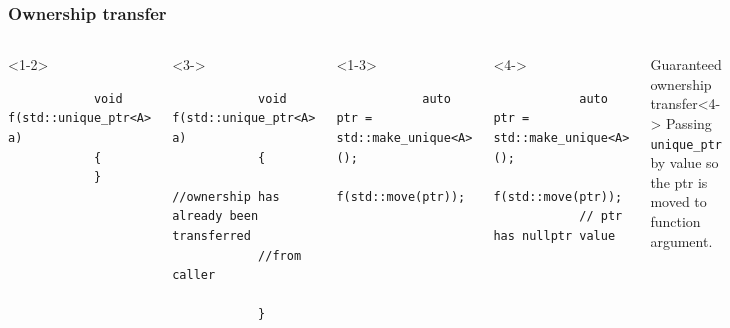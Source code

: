 \documentclass{beamer}
\begin{document}
\begin{frame}[fragile,t]
\frametitle{Ownership transfer}
	\begin{columns}[T]
        \begin{onlyenv}<1-2>
        \begin{lstlisting}
			void f(std::unique_ptr<A> a)
			{
			}	
		\end{lstlisting}
        \end{onlyenv}
        \begin{onlyenv}<3->
        \begin{lstlisting}
			void f(std::unique_ptr<A> a)
			{
            //ownership has already been transferred 
            //from caller

			}	
		\end{lstlisting}
        \end{onlyenv}
    
        \hrulefill
        \begin{onlyenv}<1-3>
        \begin{lstlisting}
            auto ptr = std::make_unique<A>();
            f(std::move(ptr));
		\end{lstlisting}
        \end{onlyenv}

        \begin{onlyenv}<4->
        \begin{lstlisting}
            auto ptr = std::make_unique<A>();
            f(std::move(ptr));
            // ptr has nullptr value
		\end{lstlisting}
        \end{onlyenv}

        \begin{block}{Guaranteed ownership transfer}<4->
            Passing \texttt{unique\_ptr} by value so the ptr is moved to function argument.
        \end{block}

        \begin{onlyenv}<1-2>
        \begin{lstlisting}
			void f(std::unique_ptr<A>&& a)
			{
			}	
		\end{lstlisting}
        \end{onlyenv}

        \begin{onlyenv}<3->
        \begin{lstlisting}
			void f(std::unique_ptr<A>&& a)
			{
            //ownership has not yet been transferred 
            //from caller. 
            //Only the reference has been passed.
			}	
		\end{lstlisting}
        \end{onlyenv}


\end{columns}
\end{frame}
\end{document}
